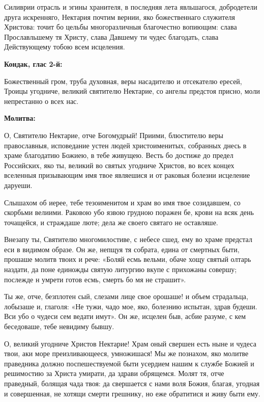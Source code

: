 Силиврии отрасль и эгины хранителя, в последняя лета явльшагося, добродетели друга искренняго, Нектария почтим вернии, яко божественнаго служителя Христова: точит бо цельбы многоразличныя благочестно вопиющим: слава Прославльшему тя Христу, слава Давшему ти чудес благодать, слава Действующему тобою всем исцеления.


\medskip


\bfseries Кондак, глас 2-й:\normalfont{}\nopagebreak


Божественный гром, труба духовная, веры насадителю и отсекателю ересей, Троицы угодниче, великий святителю Нектарие, со ангелы предстоя присно, моли непрестанно о всех нас.


\medskip


\bfseries Молитва:\normalfont{}\nopagebreak


О, Святителю Нектарие, отче Богомудрый! Приими, блюстителю веры православныя, исповедание устен людей христоименитых, собранных днесь в храме благодатию Божиею, в тебе живущею. Весть бо достиже до предел Российских, яко ты, великий во святых угодниче Христов, во всех концех вселенныя призывающим имя твое являешися и от раковыя болезни исцеление даруеши.


Слышахом об иерее, тебе тезоименитом и храм во имя твое созидавшем, со скорбьми велиими. Раковою убо язвою грудною поражен бе, крови на всяк день точащейся, и страждаше люте; дела же своего святаго не оставляше.


Внезапу ты, Святителю многомилостиве, с небесе сшед, ему во храме предстал еси в видимом образе. Он же, непщуя тя собрата, едина от смертных быти, прошаше молитв твоих и рече: «Боляй есмь вельми, обаче хощу святый олтарь наздати, да поне единожды святую литургию вкупе с прихожаны совершу; послежде н умрети готов есмь, смерть бо мя не страшит».


Ты же, отче, безплотен сый, слезами лице свое орошаше! и объем страдальца, лобызаше и, глаголя: «Не тужи, чадо мое, яко, болезнию испытан, здрав будеши. Вси убо о чудеси сем ведати имут». Он же, исцелен быв, асбие разуме, с кем беседоваше, тебе невидиму бывшу.

О, великий угодниче Христов Нектарие! Храм оный свершен есть ныне и чудеса твои, аки море преизливающееся, умножишася! Мы же познахом, яко молитве праведника должно поспешествуемой быти усердием нашим к службе Божией и решимостию за Христа умирати, да здрави обрящемся. Молят тя, отче праведный, болящая чада твоя: да свершается с нами воля Божия, благая, угодная и совершенная, не хотящи смерти грешнику, но еже обратитися и живу быти ему.


